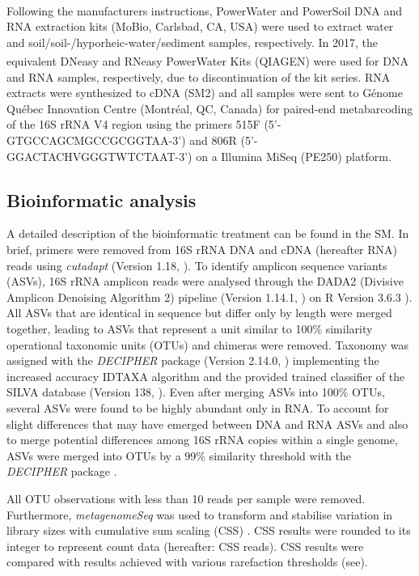 \documentclass[12pt,a4paper]{article} %
\begin{document}
Following the manufacturers instructions, PowerWater\textsuperscript{\textregistered} and PowerSoil\textsuperscript{\textregistered} DNA and RNA extraction kits (MoBio, Carlsbad, CA, USA) were used to extract water and soil/soil-/hyporheic-water/sediment samples, respectively. In 2017, the equivalent DNeasy\textsuperscript{\textregistered} and RNeasy\textsuperscript{\textregistered} PowerWater\textsuperscript{\textregistered} Kits (QIAGEN\textsuperscript{\textregistered}) were used for DNA and RNA samples, respectively, due to discontinuation of the kit series. RNA extracts were synthesized to cDNA (SM2) and all samples were sent to G\'{e}nome Qu\'{e}bec Innovation Centre (Montr\'{e}al, QC, Canada) for paired-end metabarcoding of the 16S rRNA V4 region using the primers 515F (5'-GTGCCAGCMGCCGCGGTAA-3') and 806R (5'-GGACTACHVGGGTWTCTAAT-3') on a Illumina MiSeq (PE250) platform.

\subsection*{Bioinformatic analysis}
A detailed description of the bioinformatic treatment can be found in the SM. In brief, primers were removed from 16S rRNA DNA and cDNA (hereafter RNA) reads using \textit{cutadapt} (Version 1.18, \citet{Martin2013}). To identify amplicon sequence variants (ASVs), 16S rRNA amplicon reads were analysed through the DADA2 (Divisive Amplicon Denoising Algorithm 2) pipeline (Version 1.14.1, \citet{Callahan2017}) on R Version 3.6.3 \citep{RCoreTeam2017}). All ASVs that are identical in sequence but differ only by length were merged together, leading to ASVs that represent a unit similar to 100\% similarity operational taxonomic units (OTUs) and chimeras were removed. Taxonomy was assigned with the \textit{DECIPHER} package (Version 2.14.0, \citet{Wright2016}) implementing the increased accuracy IDTAXA algorithm \citep{Murali2018} and the provided trained classifier of the SILVA database (Version 138, \citet{Pruesse2007}). Even after merging ASVs into 100\% OTUs, several ASVs were found to be highly abundant only in RNA. To account for slight differences that may have emerged between DNA and RNA ASVs and also to merge potential differences among 16S rRNA copies within a single genome, ASVs were merged into OTUs by a 99\% similarity threshold \citep{Vetrovsky2013} with the \textit{DECIPHER} package \citep{Wright2016}.

All OTU observations with less than 10 reads per sample were removed. Furthermore, \textit{metagenomeSeq} was used to transform and stabilise variation in library sizes with cumulative sum scaling (CSS) \citep{Paulson2013}. CSS results were rounded to its integer to represent count data (hereafter: CSS reads). CSS results were compared with results achieved with various rarefaction thresholds (see).
\end{document}
